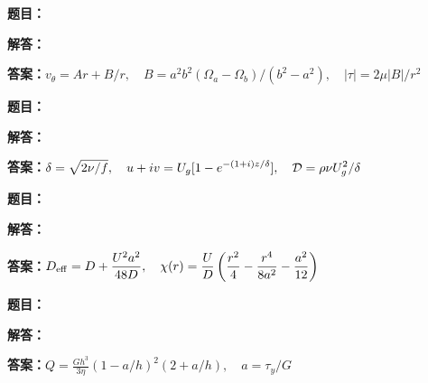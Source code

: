 \documentclass[lang=cn,color=blue,11pt]{elegantbook}
\begin{document}
\noindent\textbf{题目：}
\par\noindent\textbf{解答：}
\par\noindent\textbf{答案：}\(\displaystyle v_\theta=Ar+B/r,\quad B=a^2b^2(\Omega_a-\Omega_b)/(b^2-a^2),\quad |\tau|=2\mu|B|/r^2\)\par
\par\smallskip\noindent\hrulefill\par\medskip
{}\par
\noindent\textbf{题目：}
\par\noindent\textbf{解答：}
\par\noindent\textbf{答案：}\(\displaystyle \delta=\sqrt{2\nu/f},\quad u+iv=U_g[1-e^{-(1+i)z/\delta}],\quad {\cal D}=\rho\nu U_g^2/\delta\)\par
\par\smallskip\noindent\hrulefill\par\medskip
{}\par
\noindent\textbf{题目：}
\par\noindent\textbf{解答：}
\par\noindent\textbf{答案：}\(\displaystyle D_{\rm eff}=D+\frac{U^2a^2}{48D},\quad\chi(r)=\frac UD\left(\frac{r^2}{4}-\frac{r^4}{8a^2}-\frac{a^2}{12}\right)\)\par
\par\smallskip\noindent\hrulefill\par\medskip
{}\par
\noindent\textbf{题目：}
\par\noindent\textbf{解答：}
\par\noindent\textbf{答案：}\(\displaystyle Q=\frac{Gh^3}{3\eta}(1-a/h)^2(2+a/h),\quad a=\tau_y/G\)\par
\par\smallskip\noindent\hrulefill\par\medskip
{}\par
\end{document}
